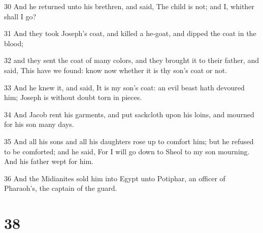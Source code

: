 \par 30 And he returned unto his brethren, and said, The child is not; and I, whither shall I go?
\par 31 And they took Joseph's coat, and killed a he-goat, and dipped the coat in the blood;
\par 32 and they sent the coat of many colors, and they brought it to their father, and said, This have we found: know now whether it is thy son's coat or not.
\par 33 And he knew it, and said, It is my son's coat: an evil beast hath devoured him; Joseph is without doubt torn in pieces.
\par 34 And Jacob rent his garments, and put sackcloth upon his loins, and mourned for his son many days.
\par 35 And all his sons and all his daughters rose up to comfort him; but he refused to be comforted; and he said, For I will go down to Sheol to my son mourning. And his father wept for him.
\par 36 And the Midianites sold him into Egypt unto Potiphar, an officer of Pharaoh's, the captain of the guard.

\chapter{38}


